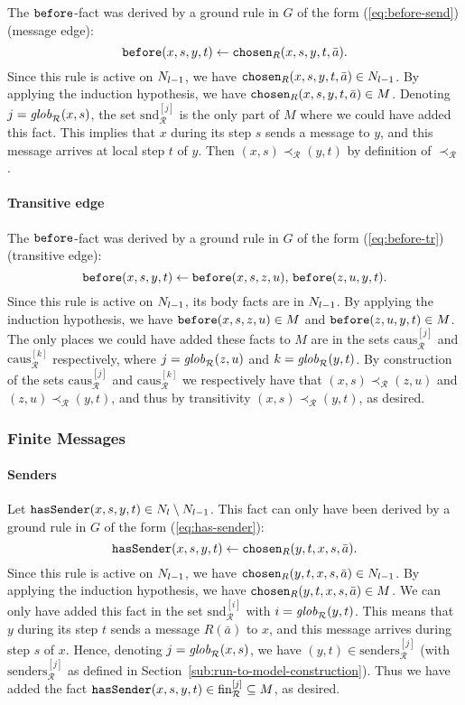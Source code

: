 \documentclass{tlp}
\newcommand{\before}{\pred{before}}
\newcommand{\chosen}{\pred{chosen}}
\newcommand{\hassender}{\pred{hasSender}}
\newcommand{\run}{\mathcal{R}}
\newcommand{\globR}[1]{\fname{glob}_{\run}(#1)}
\newcommand{\slicefin}[1]{\text{fin}_{\run}^{[#1]}}
\newcommand{\slicesnd}[1]{\text{snd}_{\run}^{[#1]}}
\newcommand{\slicecaus}[1]{\text{caus}_{\run}^{[#1]}}
\newcommand{\senders}[1]{\text{senders}_{\run}^{[#1]}}
\newcommand{\caus}{\prec_{\run}}
\newcommand{\grded}{G}
\begin{document}
\begin{appendix}
The $\before$-fact was derived by a ground rule in $\grded$ of the
form (\ref{eq:before-send}) (message edge):
\[
\before(x,s,y,t)\gets\chosen_{R}(x,s,y,t,\bar{a}).
\]
Since this rule is active on $N_{l-1}$, we have $\chosen_{R}(x,s,y,t,\bar{a})\in\prevN$.
By applying the induction hypothesis, we have $\chosen_{R}(x,s,y,t,\bar{a})\in M$.
Denoting $j=\globR{x,s}$, the set $\slicesnd j$ is the only part
of $M$ where we could have added this fact. This implies that $x$
during its step $s$ sends a message to $y$, and this message arrives
at local step $t$ of $y$. Then $(x,s)\caus(y,t)$ by definition
of $\caus$.


\paragraph*{Transitive edge}

The $\before$-fact was derived by a ground rule in $\grded$ of the
form (\ref{eq:before-tr}) (transitive edge):
\[
\before(x,s,y,t)\gets\before(x,s,z,u),\,\before(z,u,y,t).
\]
Since this rule is active on $N_{l-1}$, its body facts are in $N_{l-1}$.
By applying the induction hypothesis, we have $\before(x,s,z,u)\in M$
and $\before(z,u,y,t)\in M$. The only places we could have added
these facts to $M$ are in the sets $\slicecaus j$ and $\slicecaus k$
respectively, where $j=\globR{z,u}$ and $k=\globR{y,t}$. By construction
of the sets $\slicecaus j$ and $\slicecaus k$ we respectively have
that $(x,s)\caus(z,u)$ and $(z,u)\caus(y,t)$, and thus by transitivity
$(x,s)\caus(y,t)$, as desired.




\subsubsection{Finite Messages}


\paragraph*{Senders}

Let $\hassender(x,s,y,t)\in\diffN$. This fact can only have been
derived by a ground rule in $\grded$ of the form (\ref{eq:has-sender}):
\[
\hassender(x,s,y,t)\gets\chosen_{R}(y,t,x,s,\bar{a}).
\]
Since this rule is active on $N_{l-1}$, we have $\chosen_{R}(y,t,x,s,\bar{a})\in\prevN$.
By applying the induction hypothesis, we have $\chosen_{R}(y,t,x,s,\bar{a})\in M$.
We can only have added this fact in the set $\slicesnd i$ with $i=\globR{y,t}$.
This means that $y$ during its step $t$ sends a message $R(\bar{a})$
to $x$, and this message arrives during step $s$ of $x$. Hence,
denoting $j=\globR{x,s}$, we have $(y,t)\in\senders j$ (with $\senders j$
as defined in Section~\ref{sub:run-to-model-construction}). Thus
we have added the fact $\hassender(x,s,y,t)\in\slicefin j\subseteq M$,
as desired.



\end{appendix}
\end{document}
